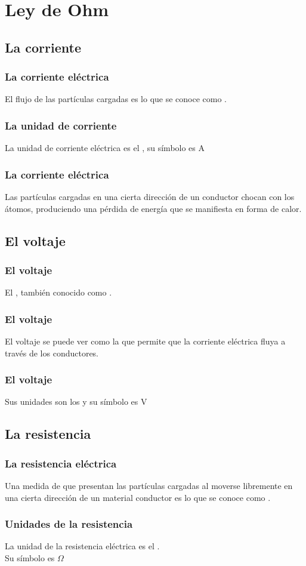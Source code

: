 \documentclass[14pt]{beamer}
\begin{document}
\section{Ley de Ohm}
\subsection{La corriente}

\begin{frame}
\frametitle{La corriente eléctrica}
El flujo de las partículas cargadas es lo que se conoce como .
\end{frame}
\begin{frame}
\frametitle{La unidad de corriente}
La unidad de corriente eléctrica es el , su símbolo es \si{\ampere}
\end{frame}
\begin{frame}
\frametitle{La corriente eléctrica}
Las partículas cargadas en una cierta dirección de un conductor chocan con los átomos, \pause produciendo una pérdida de energía que se manifiesta en forma de calor.
\end{frame}

\subsection{El voltaje}

\begin{frame}
\frametitle{El voltaje}
El , \pause también conocido como .
\end{frame}
\begin{frame}
\frametitle{El voltaje}
El voltaje se puede ver como la  que permite que la corriente eléctrica fluya a través de los conductores.
\end{frame}
\begin{frame}
\frametitle{El voltaje}
Sus unidades son los  y su símbolo es \si{\volt}
\end{frame}

\subsection{La resistencia}

\begin{frame}
\frametitle{La resistencia eléctrica}
Una medida de  que presentan las partículas cargadas al moverse libremente en una cierta dirección de un material conductor \pause es lo que se conoce como .
\end{frame}
\begin{frame}
\frametitle{Unidades de la resistencia}
La unidad de la resistencia eléctrica es el .
\\
\bigskip
\pause
Su símbolo es $\Omega$
\end{frame}
\end{document}
